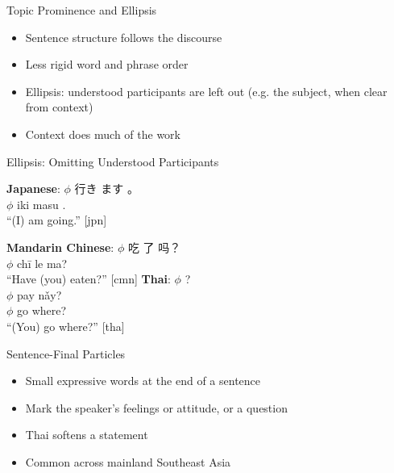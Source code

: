 \documentclass{beamer}
\begin{document}
\begin{frame}{Topic Prominence and Ellipsis}
    \begin{itemize}
        \item Sentence structure follows the discourse
        \item Less rigid word and phrase order
        \item Ellipsis: understood participants are left out
          (e.g. the subject, when clear from context)
        \item Context does much of the work
    \end{itemize}
\end{frame}
\begin{frame}{Ellipsis: Omitting Understood Participants}
  \begin{exe}
    \ex \textbf{Japanese}:
    \gll  $\phi$ 行き ます 。  \\
    $\phi$ iki masu . \\
    \glt  ``(I) am going.'' [jpn]

   \ex \textbf{Mandarin Chinese}:
                 \gll  $\phi$ 吃 了 吗？ \\
                 $\phi$ chī le ma? \\
                 \glt``Have (you) eaten?'' [cmn]
         \ex \textbf{Thai}:
                 \glll  $\phi$  ? \\
                 $\phi$ pay nǎy? \\
                 $\phi$ go where? \\
                 \glt ``(You) go where?'' [tha]
     \end{exe}

  \end{frame}

\begin{frame}{Sentence-Final Particles}
    \begin{itemize}
        \item Small expressive words at the end of a sentence
        \item Mark the speaker's feelings or attitude, or a question
        \item Thai   softens a statement
        \item Common across mainland Southeast Asia
    \end{itemize}
  \end{frame}
  
\end{document}

